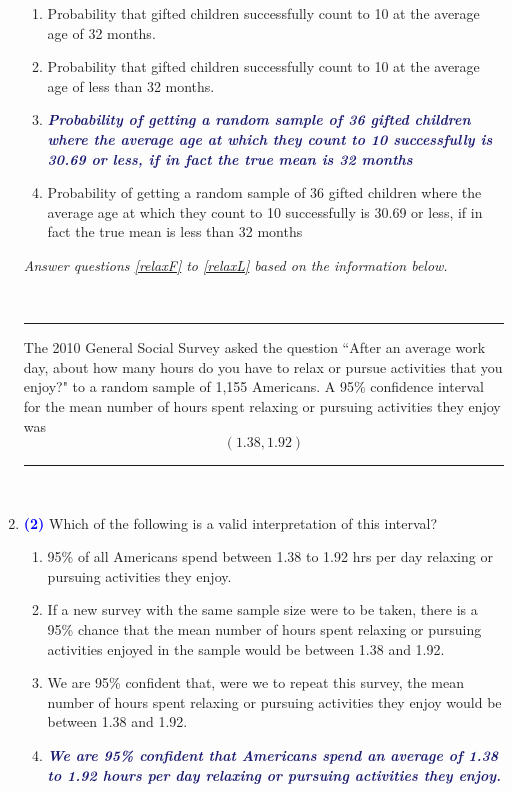 \documentclass[11pt]{article}
\newcommand{\solnMult}[1]{\textbf{\textcolor{MidnightBlue}{\textit{#1}}}}	%
\newcommand{\pts}[1]{ \textbf{{\footnotesize \textcolor{blue}{(#1)}}} }	%
\begin{document}
\begin{enumerate}
\begin{enumerate}
\item Probability that gifted children successfully count to 10 at the average age of 32 months.
\item Probability that gifted children successfully count to 10 at the average age of less than 32 months.
\item \solnMult{Probability of getting a random sample of 36 gifted children where the average age at which they count to 10 successfully is 30.69 or less, if in fact the true mean is 32 months}
\item Probability of getting a random sample of 36 gifted children where the average age at which they count to 10 successfully is 30.69 or less, if in fact the true mean is less than 32 months
\end{enumerate}

\vfill

\pagebreak

%



%

\pagebreak

\begin{center}
\textit{Answer questions \ref{relaxF} to \ref{relaxL} based on the information below.}
\end{center}
$\:$
\hrule
The 2010 General Social Survey asked the question ``After an average work day, about how many hours do you have to relax or pursue activities that you enjoy?" to a random sample of 1,155 Americans. A 95\% confidence interval for the mean number of hours spent relaxing or pursuing activities they enjoy was	
\[ (1.38, 1.92) \]
\hrule
$\:$


\item \pts{2} \label{relaxF} Which of the following is a valid interpretation of this interval?
\begin{enumerate}
\item 95\% of all Americans spend between 1.38 to 1.92 hrs per day relaxing or pursuing activities they enjoy.
\item If a new survey with the same sample size were to be taken, there is a 95\% chance that the mean number of hours spent relaxing or pursuing activities enjoyed in the sample would be between 1.38 and 1.92.
\item We are 95\% confident that, were we to repeat this survey, the mean number of hours spent relaxing or pursuing activities they enjoy would be between 1.38 and 1.92.
\item \solnMult{We are 95\% confident that Americans spend an average of 1.38 to 1.92 hours per day  relaxing or pursuing activities they enjoy.} \\
\end{enumerate}


\end{enumerate}
\end{document}
